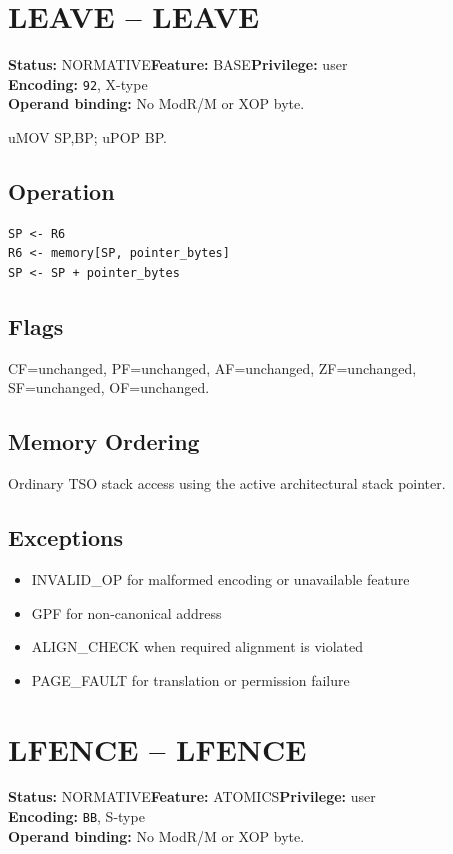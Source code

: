 \documentclass[10pt]{article}
\begin{document}
\section{LEAVE -- LEAVE}
\textbf{Status:} NORMATIVE\quad \textbf{Feature:} BASE\quad \textbf{Privilege:} user\\
\textbf{Encoding:} \texttt{92}, X-type\\
\textbf{Operand binding:} No ModR/M or XOP byte.

uMOV SP,BP; uPOP BP.

\subsection*{Operation}
\begin{lstlisting}
SP <- R6
R6 <- memory[SP, pointer_bytes]
SP <- SP + pointer_bytes
\end{lstlisting}
\subsection*{Flags}
CF=unchanged, PF=unchanged, AF=unchanged, ZF=unchanged, SF=unchanged, OF=unchanged.
\subsection*{Memory Ordering}
Ordinary TSO stack access using the active architectural stack pointer.
\subsection*{Exceptions}
\begin{itemize}
\item INVALID\_OP for malformed encoding or unavailable feature
\item GPF for non-canonical address
\item ALIGN\_CHECK when required alignment is violated
\item PAGE\_FAULT for translation or permission failure
\end{itemize}
\clearpage

\section{LFENCE -- LFENCE}
\textbf{Status:} NORMATIVE\quad \textbf{Feature:} ATOMICS\quad \textbf{Privilege:} user\\
\textbf{Encoding:} \texttt{BB}, S-type\\
\textbf{Operand binding:} No ModR/M or XOP byte.
\end{document}
